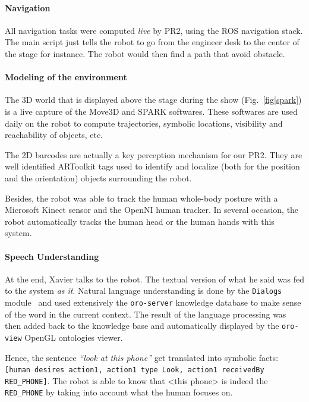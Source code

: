 \paragraph{Navigation} All navigation tasks were computed \emph{live} by
PR2, using the ROS navigation stack. The main script just tells the robot to go
from the engineer desk to the center of the stage for instance. The robot would
then find a path that avoid obstacle.  

\paragraph{Modeling of the environment} The 3D world that is displayed above
the stage during the show (Fig.~\ref{fig|spark}) is a live capture of the
Move3D and SPARK softwares. These softwares are used daily on the robot to
compute trajectories, symbolic locations, visibility and reachability of
objects, etc.


The 2D barcodes are actually a key perception mechanism for our PR2. They are
well identified {\sc ARToolkit} tags used to identify and localize (both for the
position and the orientation) objects surrounding the robot.

Besides, the robot was able to track the human whole-body posture with a
Microsoft Kinect sensor and the {\sc OpenNI} human tracker. In several
occasion, the robot automatically tracks the human head or the human hands with
this system.

\paragraph{Speech Understanding} At the end, Xavier talks to the robot. The
textual version of what he said was fed to the system \emph{as it}. Natural
language understanding is done by the {\tt Dialogs}
module~\cite{Lemaignan2011a} and used extensively the {\tt oro-server} knowledge
database to make sense of the word in the current context. The result of the
language processing was then added back to the knowledge base and automatically
displayed by the {\tt oro-view} OpenGL ontologies viewer.

Hence, the sentence \emph{``look at this phone''} get translated into symbolic
facts: {\tt [human desires action1, action1 type Look, action1 receivedBy
RED\_PHONE]}. The robot is able to know that <this phone> is indeed the {\tt
RED\_PHONE} by taking into account what the human focuses on.

